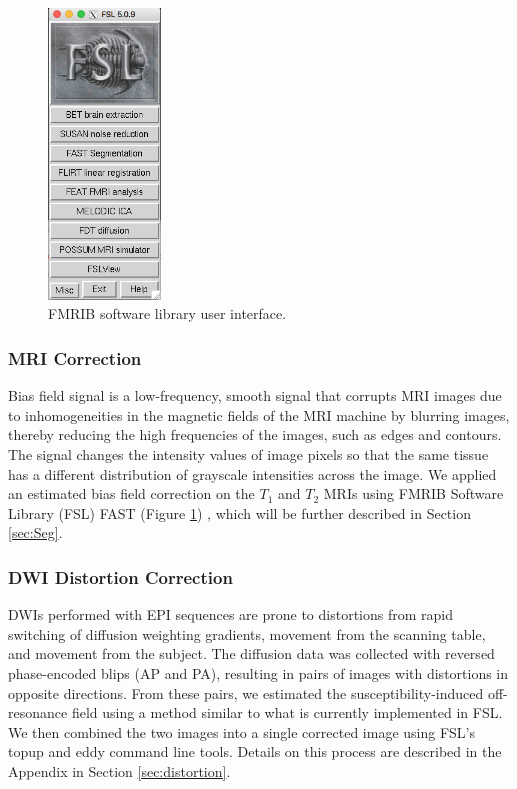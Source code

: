 \begin{figure}
    \centering
    \vspace{-63pt}
    \includegraphics[width=3cm]{Figures/FSL}
    \caption{FMRIB software library user interface.}
    \label{fig:fsl}
\end{figure}

\subsubsection{MRI Correction}

Bias field signal is a low-frequency, smooth signal that corrupts MRI images due to inhomogeneities in the magnetic fields of the MRI machine by blurring images, thereby reducing the high frequencies of the images, such as edges and contours. The signal changes the intensity values of image pixels so that the same tissue has a different distribution of grayscale intensities across the image. \cite{ref:bias} We applied an estimated bias field correction on the $T_1$ and $T_2$ MRIs using FMRIB Software Library (FSL) FAST (Figure \ref{fig:fsl}) \cite{ref:fslfast}, which will be further described in Section \ref{sec:Seg}.

\subsubsection{DWI Distortion Correction}

DWIs performed with EPI sequences are prone to distortions from rapid switching of diffusion weighting gradients, movement from the scanning table, and movement from the subject. The diffusion data was collected with reversed phase-encoded blips (AP and PA), resulting in pairs of images with distortions in opposite directions. From these pairs, we estimated the susceptibility-induced off-resonance field using a method \cite{ref:fsltopup1} similar to what is currently implemented in FSL.\cite{ref:fsltopup2} We then combined the two images into a single corrected image using FSL's topup and eddy command line tools. Details on this process are described in the Appendix in Section \ref{sec:distortion}.

